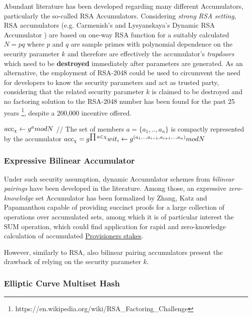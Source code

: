 Abundant literature has been developed regarding many different Accumulators, particularly the so-called RSA Accumulators. Considering \textit{strong RSA setting}, RSA accumulators (e.g. Carmenish's and Lysyanskaya's Dynamic RSA Accumulator \cite{accumulators}) are based on one-way RSA function for a suitably calculated $N =pq$ where $p$ and $q$ are sample primes with polynomial dependence on the security parameter $k$ and therefore are effectively the accumulator's \textit{trapdoors} which need to be \textbf{destroyed} immediately after parameters are generated. As an alternative, the employment of RSA-2048 could be used to circumvent the need for developers to know the security parameters and act as trusted party, considering that the related security parameter $k$ is claimed to be destroyed and no factoring solution to the RSA-2048 number has been found for the past 25 years \footnote{https://en.wikipedia.org/wiki/RSA\_Factoring\_Challenge}, despite a 200,000 incentive offered.

$acc_\chi \leftarrow g^{a} mod\space N$ // The set of members $a =\{a_1, .., a_n\}$ is compactly represented by the accumulator
$acc_\chi = g^{\prod{a \in \chi}}\\wit_i \leftarrow g^{(a_1, .., a_{i-1}, a_{i+1}, .., a_n)} mod\space N$

\subsubsection{Expressive Bilinear Accumulator}

Under such security assumption, dynamic Accumulator schemes from \textit{bilinear pairings} have been developed in the literature. Among those, an expressive \textit{zero-knowledge} set Accumulator has been formalized by Zhang, Katz and Papamanthou \cite{zeroaccum} capable of providing succinct proofs for a large collection of operations over accumulated sets, among which it is of particular interest the $\textrm{SUM}$ operation, which could find application for rapid and zero-knowledge calculation of accumulated \hyperref[sec:Cryptographically-Committed-Provisioners]{Provisioners stakes}.

However, similarly to RSA, also bilinear pairing accumulators present the drawback of relying on the security parameter $k$.

\subsubsection{Elliptic Curve Multiset Hash}

